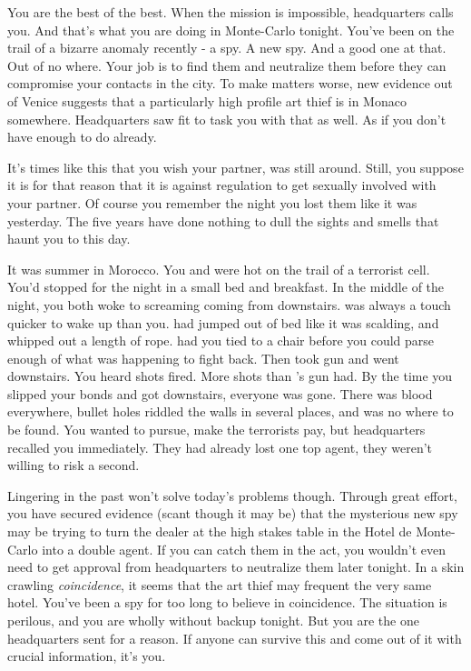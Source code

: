\documentclass[char]{AtlanticCity}
\begin{document}
\name{\cBond{}}

You are the best of the best. When the mission is impossible, headquarters calls you. And that's what you are doing in Monte-Carlo tonight. You've been on the trail of a bizarre anomaly recently - a spy. A new spy. And a good one at that. Out of no where. Your job is to find them and neutralize them before they can compromise your contacts in the city. To make matters worse, new evidence out of Venice suggests that a particularly high profile art thief is in Monaco somewhere. Headquarters saw fit to task you with that as well. As if you don't have enough to do already.

It's times like this that you wish your partner, \cPartner{} was still around. Still, you suppose it is for that reason that it is against regulation to get sexually involved with your partner. Of course you remember the night you lost them like it was yesterday. The five years have done nothing to dull the sights and smells that haunt you to this day.

It was summer in Morocco. You and \cPartner{} were hot on the trail of a terrorist cell. You'd stopped for the night in a small bed and breakfast. In the middle of the night, you both woke to screaming coming from downstairs. \cPartner{\They} was always a touch quicker to wake up than you. \cPartner{} had jumped out of bed like it was scalding, and whipped out a length of rope. \cPartner{\They} had you tied to a chair before you could parse enough of what was happening to fight back. Then \cPartner{\They} took \cPartner{\their} gun and went downstairs. You heard shots fired. More shots than \cPartner{}'s gun had. By the time you slipped your bonds and got downstairs, everyone was gone. There was blood everywhere, bullet holes riddled the walls in several places, and \cPartner{} was no where to be found. You wanted to pursue, make the terrorists pay, but headquarters recalled you immediately. They had already lost one top agent, they weren't willing to risk a second.

Lingering in the past won't solve today's problems though. Through great effort, you have secured evidence (scant though it may be) that the mysterious new spy may be trying to turn the dealer at the high stakes table in the Hotel de Monte-Carlo into a double agent. If you can catch them in the act, you wouldn't even need to get approval from headquarters to neutralize them  later tonight. In a skin crawling \emph{coincidence}, it seems that the art thief may frequent the very same hotel. You've been a spy for too long to believe in coincidence. The situation is perilous, and you are wholly without backup tonight. But you are the one headquarters sent for a reason. If anyone can survive this and come out of it with crucial information, it's you.


\begin{itemz}[Goals]
	\item 
\end{itemz}

\begin{itemz}[Notes]
	\item 
\end{itemz}

\begin{contacts}
\end{contacts}
\end{document}
